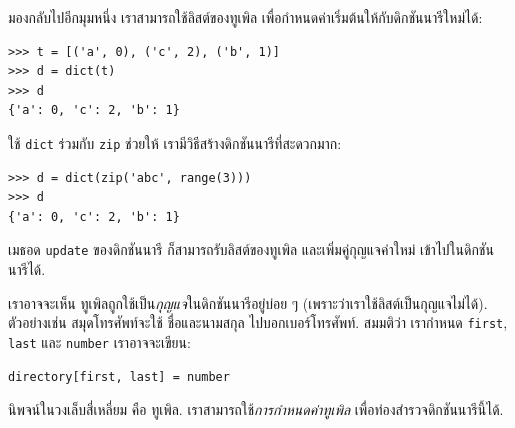%
มองกลับไปอีกมุมหนึ่ง
เราสามารถใช้ลิสต์ของทูเพิล
เพื่อกำหนดค่าเริ่มต้นให้กับดิกชันนารีใหม่ได้:

\begin{verbatim}
>>> t = [('a', 0), ('c', 2), ('b', 1)]
>>> d = dict(t)
>>> d
{'a': 0, 'c': 2, 'b': 1}
\end{verbatim}

%
ใช้ \texttt{dict} ร่วมกับ \texttt{zip} ช่วยให้ เรามีวิธีสร้างดิกชันนารีที่สะดวกมาก:

\begin{verbatim}
>>> d = dict(zip('abc', range(3)))
>>> d
{'a': 0, 'c': 2, 'b': 1}
\end{verbatim}
%
%
เมธอด \texttt{update} ของดิกชันนารี
ก็สามารถรับลิสต์ของทูเพิล
และเพิ่มคู่กุญแจค่าใหม่ เข้าไปในดิกชันนารีได้.
%

%
เราอาจจะเห็น ทูเพิลถูกใช้เป็น\textit{กุญแจ}ในดิกชันนารีอยู่บ่อย ๆ (เพราะว่าเราใช้ลิสต์เป็นกุญแจไม่ได้).
ตัวอย่างเช่น สมุดโทรศัพท์จะใช้ ชื่อและนามสกุล ไปบอกเบอร์โทรศัพท์.
สมมติว่า เรากำหนด \texttt{first}, \texttt{last} และ \texttt{number} เราอาจจะเขียน:
%

%
%
%
\begin{verbatim}
directory[first, last] = number
\end{verbatim}
%
นิพจน์ในวงเล็บสี่เหลี่ยม คือ ทูเพิล.
เราสามารถใช้\textit{การกำหนดค่าทูเพิล} เพื่อท่องสำรวจดิกชันนารีนี้ได้.

